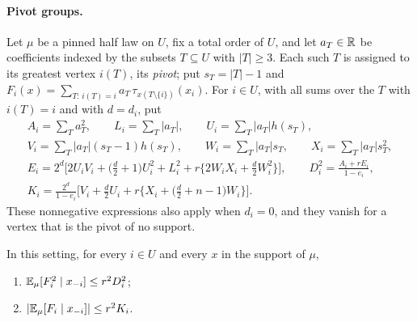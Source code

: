 \paragraph{Pivot groups.} Let $\mu$ be a pinned half law on $U$, fix a total
order of $U$, and let $a_T\in\mathbb R$ be coefficients indexed by the subsets
$T\subseteq U$ with $|T|\ge3$. Each such $T$ is assigned to its greatest vertex
$i(T)$, its \emph{pivot}; put $s_T=|T|-1$ and
$F_i(x)=\sum_{T:\,i(T)=i}a_T\,\tau_{x(T\setminus\{i\})}(x_i)$. For $i\in U$, with
all sums over the $T$ with $i(T)=i$ and with $d=d_i$, put
\begin{equation}\label{eq:pivot-sums}
\begin{gathered}
 A_i=\sum_Ta_T^2,\qquad L_i=\sum_T|a_T|,\qquad
 U_i=\sum_T|a_T|h(s_T),\\
 V_i=\sum_T|a_T|(s_T-1)h(s_T),\qquad
 W_i=\sum_T|a_T|s_T,\qquad X_i=\sum_T|a_T|s_T^2,\\
 E_i=2^d\Big[2U_iV_i+\big(\tfrac d2+1\big)U_i^2+L_i^2
   +r\big\{2W_iX_i+\tfrac d2W_i^2\big\}\Big],\qquad
 D_i^2=\frac{A_i+rE_i}{1-e_i},\\
 K_i=\frac{2^d}{1-e_i}\Big[V_i+\tfrac d2U_i
   +r\big\{X_i+\big(\tfrac d2+n-1\big)W_i\big\}\Big].
\end{gathered}
\end{equation}
These nonnegative expressions also apply when $d_i=0$, and they vanish for a
vertex that is the pivot of no support.

\begin{lemma}\label{lem:pivot-moments}
In this setting, for every $i\in U$ and every $x$ in the support of $\mu$,
\begin{enumerate}[label=\textup{(\alph*)}]
\item $\mathbb E_\mu[F_i^2\mid x_{-i}]\le r^2D_i^2$;
\item $|\mathbb E_\mu[F_i\mid x_{-i}]|\le r^2K_i$.
\end{enumerate}
\end{lemma}

